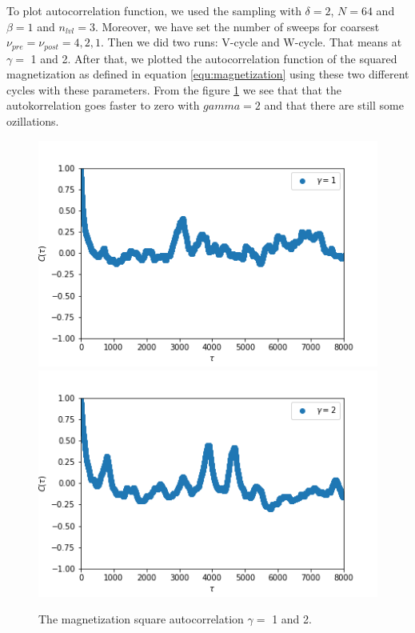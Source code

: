 \documentclass[11pt, a4paper, DIV=12]{scrartcl}
\begin{document}
To plot autocorrelation function, we used the sampling with $ \delta=2 $, $ N=64 $ and $ \beta=1 $ and $n_{lvl}=3$. Moreover, we have set the number of sweeps for coarsest $ \nu_{pre}= \nu_{post}=4, 2, 1 $. Then we did two runs: V-cycle and W-cycle. That means at $ \gamma = $ 1 and 2. After that, we plotted the autocorrelation function of the squared magnetization as defined in equation \ref{equ:magnetization} using these two different cycles with these parameters. From the figure \ref{fig:autocorrelation} we see that that the autokorrelation goes faster to zero with $gamma=2$ and that there are still some ozillations. 
\begin{figure}[H]
	\centering
	\includegraphics[width=0.6\linewidth]{magnitization_square_autocorrelation_gamma1.png}\includegraphics[width=0.6\linewidth]{magnitization_square_autocorrelation_gamma2.png}
	\caption{The magnetization square autocorrelation $\gamma =$ 1 and 2.}
	\label{fig:autocorrelation}
\end{figure}
\end{document}
